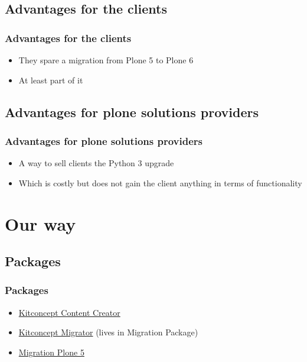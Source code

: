 \documentclass[aspectratio=169]{beamer}
\begin{document}
\subsection{Advantages for the clients}
\begin{frame}
  \frametitle{Advantages for the clients}
  \begin{itemize}
    \item They spare a migration from Plone 5 to Plone 6 \pause
    \item At least part of it
  \end{itemize}
\end{frame}

\subsection{Advantages for plone solutions providers}
\begin{frame}
  \frametitle{Advantages for plone solutions providers}
  \begin{itemize}
    \item A way to sell clients the Python 3 upgrade \pause
    \item Which is costly but does not gain the client anything in terms of functionality
  \end{itemize}
\end{frame}

\section{Our way}
\subsection{Packages}
\begin{frame}
  \frametitle{Packages}
  \begin{itemize}
    \item \href{https://github.com/kitconcept/kitconcept.contentcreator}{Kitconcept Content Creator} \pause
    \item \href{https://github.com/kitconcept/migration-plone5/tree/master/src/kitconcept.migrator}{Kitconcept Migrator} (lives in Migration Package) \pause
    \item \href{https://github.com/kitconcept/migration-plone5}{Migration Plone 5}
  \end{itemize}
\end{frame}
\end{document}
